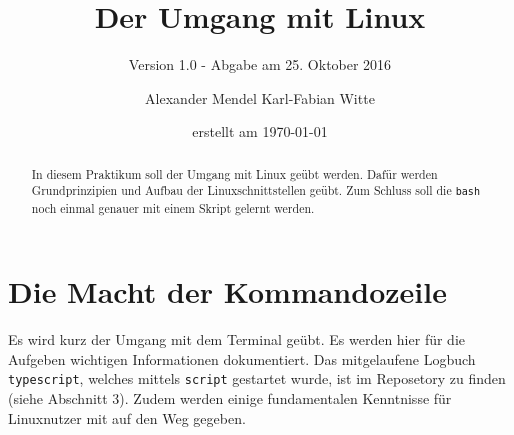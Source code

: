 \documentclass[
   draft=false
  ,paper=a4
  ,twoside=false
  ,fontsize=11pt
  ,headsepline
  ,BCOR10mm
  ,DIV11
  ,parskip=full+
]{scrartcl} %
\begin{document}
\titlehead{Betriebsysteme WS 2016 Praktikum 01 Protokoll}%
\subject{BS Praktikumsaufgabe 01}
\title{Der Umgang mit Linux}
\subtitle{Version 1.0 - Abgabe am 25. Oktober 2016}
\author{Alexander Mendel  Karl-Fabian Witte}
\date{erstellt am \today}%
\maketitle%
\begin{abstract}
  In diesem Praktikum soll der Umgang mit Linux geübt werden.
  Dafür werden Grundprinzipien und Aufbau der Linuxschnittstellen geübt.
  Zum Schluss soll die \texttt{bash} noch einmal genauer mit einem Skript
  gelernt werden.
\end{abstract}
\tableofcontents
\flushleft
\section{Die Macht der Kommandozeile}
Es wird kurz der Umgang mit dem Terminal geübt. Es werden hier für die
Aufgeben wichtigen Informationen dokumentiert. Das mitgelaufene Logbuch
\texttt{typescript}, welches mittels \texttt{script} gestartet wurde, ist im
Reposetory zu finden (siehe Abschnitt 3). Zudem werden einige fundamentalen
Kenntnisse für Linuxnutzer mit auf den Weg gegeben.
\end{document}
